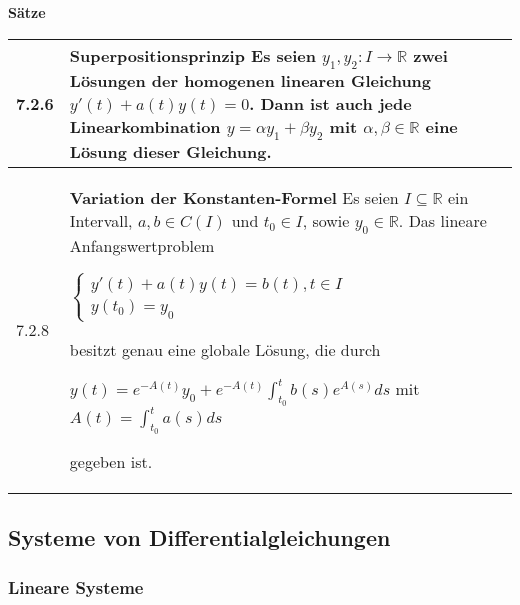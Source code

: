     \noindent 
    \textbf{Sätze}
    \begin{table}[H]
    \begin{tabularx}{\textwidth}{X m{16cm}}
        \toprule

        7.2.6 & \textbf{Superpositionsprinzip} \hfill \break
                Es seien $y_1, y_2: I \rightarrow \mathbb{R}$ zwei Lösungen der homogenen linearen Gleichung $y'(t) + a(t)y(t) = 0$.
                Dann ist auch jede Linearkombination $y = \alpha y_1 + \beta y_2$ mit $\alpha, \beta \in \mathbb{R}$ eine Lösung dieser
                Gleichung. \\
        \midrule
        7.2.8 & \textbf{Variation der Konstanten-Formel} \hfill \break
                Es seien $I \subseteq \mathbb{R}$ ein Intervall, $a,b \in C(I)$ und $t_0 \in I$, sowie $y_0 \in \mathbb{R}$. Das lineare
                Anfangswertproblem \hfill \break
                \centerline{$   \begin{cases}
                                y'(t) + a(t)y(t) = b(t), t \in I \\
                                y(t_0) = y_0
                                \end{cases} $}
                besitzt genau eine globale Lösung, die durch \hfill \break
                \centerline{$ y(t) = e^{-A(t)} y_0 + e^{-A(t)} \int^t_{t_0} b(s)e^{A(s)}ds$ mit $ A(t) = \int^t_{t_0} a(s) ds $}
                gegeben ist. \\

        \bottomrule
    \end{tabularx}
    \end{table}

\subsection{Systeme von Differentialgleichungen}
\subsubsection{Lineare Systeme}

